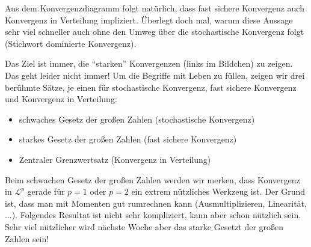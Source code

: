 Aus dem Konvergenzdiagramm folgt nat\"urlich, dass fast sichere Konvergenz auch Konvergenz in Verteilung impliziert. \"Uberlegt doch mal, warum diese Aussage sehr viel schneller auch ohne den Umweg \"uber die stochastische Konvergenz folgt (Stichwort dominierte Konvergenz).\smallskip




	Das Ziel ist immer, die \enquote{starken} Konvergenzen (links im Bildchen) zu zeigen. Das geht leider nicht immer! Um die Begriffe mit Leben zu f\"ullen, zeigen wir drei ber\"uhmte S\"atze, je einen f\"ur stochastische Konvergenz, fast sichere Konvergenz und Konvergenz in Verteilung:
\begin{itemize}
	\item schwaches Gesetz der gro\ss en Zahlen (stochastische Konvergenz)
	\item starkes Gesetz der gro\ss en Zahlen (fast sichere Konvergenz)
	\item Zentraler Grenzwertsatz (Konvergenz in Verteilung)
\end{itemize}
Beim schwachen Gesetz der gro\ss en Zahlen werden wir merken, dass Konvergenz in $\mathcal L^p$ gerade f\"ur $p=1$ oder $p=2$ ein extrem n\"utzliches Werkzeug ist. Der Grund ist, dass man mit Momenten gut rumrechnen kann (Ausmultiplizieren, Linearit\"at, ...). Folgendes Resultat ist nicht sehr kompliziert, kann aber schon n\"utzlich sein. Sehr viel n\"utzlicher wird n\"achste Woche aber das starke Gesetzt der gro\ss en Zahlen sein!

